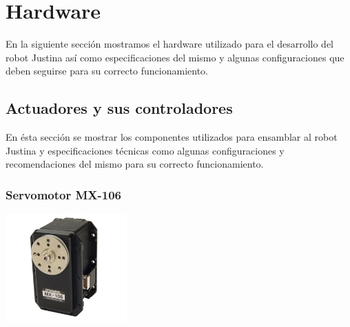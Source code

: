 \documentclass[user_manual.tex]{subfiles}
\begin{document}
\chapter{Hardware} \label{aped.A}
En la siguiente sección mostramos el hardware utilizado para el desarrollo del robot Justina así como especificaciones
del mismo y algunas configuraciones que deben seguirse para su correcto funcionamiento.


\section{Actuadores y sus controladores}
En ésta sección se mostrar los componentes utilizados para ensamblar al robot Justina y especificaciones técnicas como
algunas configuraciones y recomendaciones del mismo para su correcto funcionamiento.


\subsection{Servomotor MX-106}

\begin{center}
\includegraphics[width=0.35\textwidth]{Figures/Hardware/Partes/MX-106.png}
\label{fig:Hardware:Partes:MX-106}
\end{center}
\end{document}
